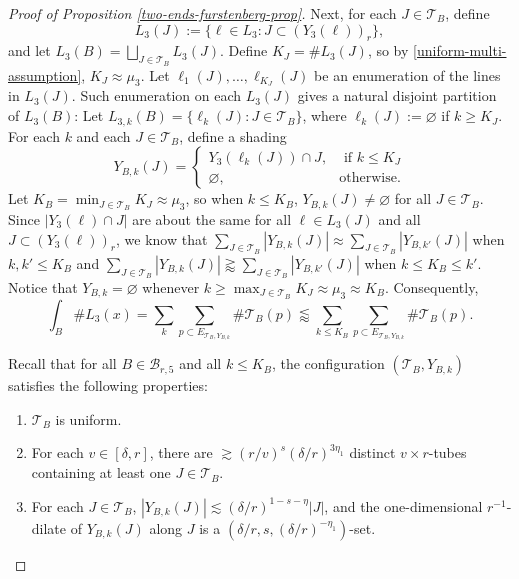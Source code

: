 \documentclass{amsart}
\numberwithin{equation}{section}
\newcommand{\de}{\delta}
\newcommand{\cb}{\mathcal B}
\newcommand{\cT}{{\mathcal T}}
\begin{document}
\begin{proof}[Proof of Proposition \ref{two-ends-furstenberg-prop}]
Next, for each $J\in\cT_B$, define
\begin{equation}
    L_3(J):=\{\ell\in L_3: J\subset(Y_3(\ell))_r\},
\end{equation}
and let $L_3(B)=\bigsqcup_{J\in\cT_B}L_3(J)$. 
Define $K_J=\#L_3(J)$, so by \eqref{uniform-multi-assumption}, $K_J\approx \mu_3$. 
Let $\ell_1(J),\ldots, \ell_{K_J}(J)$ be an enumeration of the lines in $L_3(J)$.
Such enumeration on each $L_3(J)$ gives a natural disjoint partition of $L_3(B)$: 
Let $L_{3,k}(B)=\{\ell_{k}(J):J\in\cT_B\}$, where $\ell_{k}(J):=\varnothing$ if $k\geq K_J$.
For each $k$ and each $J\in\cT_B$, define a shading
\begin{equation}
\label{shading-B-k}
    Y_{B,k}(J)=\left\{\begin{array}{cc}
    Y_3(\ell_k(J)) \cap J,  & \text{ if } k \leq K_J \\
    \varnothing,   & \text{otherwise}.
    \end{array}\right.
\end{equation}
Let $K_B = \min_{ J\in \cT_B} K_J\approx \mu_3$, so when $k\leq K_B$, $Y_{B,k}(J)\not=\varnothing$ for all $J\in\cT_B$.
Since $|Y_3(\ell)\cap J|$ are about the same for all $\ell\in L_3(J)$ and all $J\subset(Y_3(\ell))_r$, we know that $\sum_{J\in\cT_B}|Y_{B,k}(J)|\approx\sum_{J\in\cT_B}|Y_{B,k'}(J)|$ when $k,k'\leq K_B$ and $\sum_{J\in\cT_B}|Y_{B,k}(J)|\gtrapprox\sum_{J\in\cT_B}|Y_{B,k'}(J)|$ when $k\leq K_B\leq k'$.
Notice that $Y_{B,k}=\varnothing$ whenever $k\geq\max_{J\in\cT_B}K_J\approx\mu_3\approx K_B$.
Consequently,
\begin{equation}
\label{a-lot-of-J}
    \int_{B}\#L_3(x)=\sum_k\sum_{p\subset E_{\cT_B, Y_{B,k}}}\#\cT_B(p)\lessapprox\sum_{k\leq K_B}\sum_{p\subset E_{\cT_{B}, Y_{B,k}}}\#\cT_{B}(p).
\end{equation}

\medskip





Recall that for all $B\in\cb_{r,5}$ and all $k\leq K_B$,  the configuration $(\cT_B, Y_{B,k})$ satisfies the following properties:
\begin{enumerate}
    \item $\cT_B$ is uniform.
    \item For each $v\in[\de,r]$, there are $\gtrsim (r/v)^{s}(\de/r)^{3\eta_1}$ distinct $v\times r$-tubes containing at least one $J\in\cT_B$. 
    \item For each $J\in\cT_B$, $|Y_{B,k}(J)|\lesssim(\de/r)^{1-s-\eta}|J|$, and the one-dimensional $r^{-1}$-dilate of $Y_{B,k}(J)$ along $J$ is a $(\de/r, s, (\de/r)^{-\eta_1})$-set.
\end{enumerate}


\end{proof}
\end{document}

